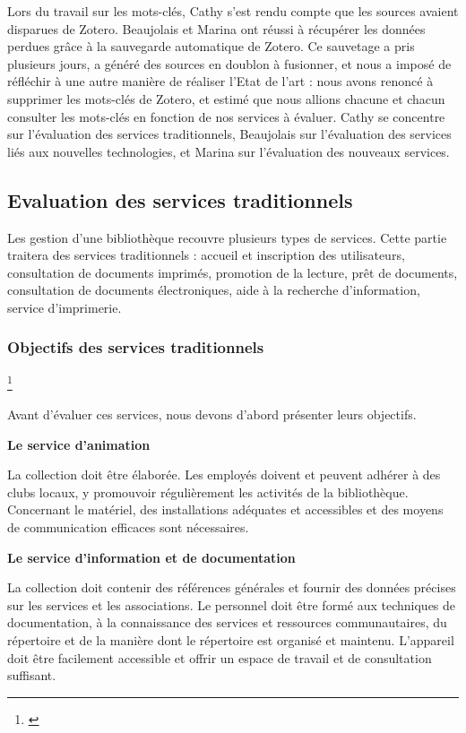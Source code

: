 \documentclass[french,a4paper,12pt]{article}
\begin{document}
\quad Lors du travail sur les mots-clés, Cathy s’est rendu compte que les sources avaient disparues de Zotero. Beaujolais et Marina ont réussi à récupérer les données perdues grâce à la sauvegarde automatique de Zotero. Ce sauvetage a pris plusieurs jours, a généré des sources en doublon à fusionner, et nous a imposé de réfléchir à une autre manière de réaliser l’Etat de l'art : nous avons renoncé à supprimer les mots-clés de Zotero, et estimé que nous allions chacune et chacun consulter les mots-clés en fonction de nos services à évaluer. 
Cathy se concentre sur l’évaluation des services traditionnels, Beaujolais sur l’évaluation des services liés aux nouvelles technologies, et Marina sur l’évaluation des nouveaux services.\\
\quad 



\subsection{Evaluation des services traditionnels}


\quad Les gestion d'une bibliothèque recouvre plusieurs types de services. Cette partie  traitera des services traditionnels : accueil et inscription des utilisateurs, consultation de documents imprimés, promotion de la lecture, prêt de documents, consultation de documents électroniques, aide à la recherche d’information, service d'imprimerie.  


\subsubsection{Objectifs des services traditionnels} \footnote{\citep{Gouyon}}

\quad Avant d'évaluer ces services, nous devons d'abord présenter leurs objectifs.

\textbf{Le service d'animation}

\quad La collection doit être élaborée. Les employés doivent et peuvent adhérer à des clubs locaux, y promouvoir régulièrement les activités de la bibliothèque. Concernant le matériel, des installations adéquates et accessibles et des moyens de communication efficaces sont nécessaires. 

\textbf{Le service d'information et de documentation}

\quad La collection doit contenir des références générales et fournir des données précises sur les services et les associations. Le personnel doit être formé aux techniques de documentation, à la connaissance des services et ressources communautaires, du répertoire et de la manière dont le répertoire est organisé et maintenu. L'appareil doit être facilement accessible et offrir un espace de travail et de consultation suffisant. 
\end{document}
